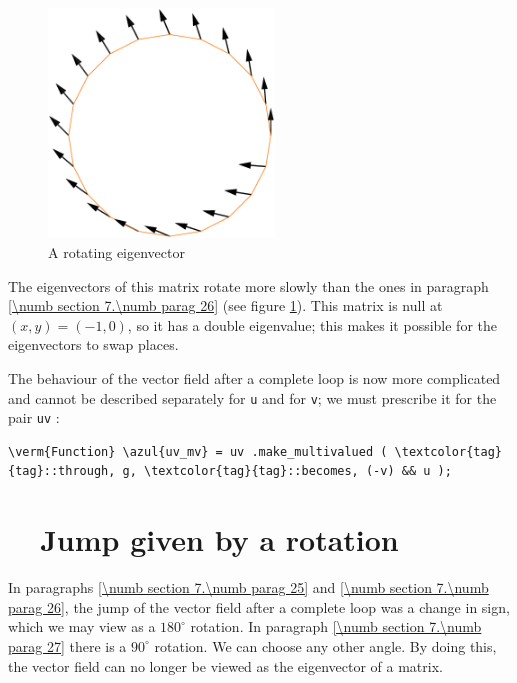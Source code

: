 \begin{figure}[ht] \centering
  \includegraphics[width=60mm]{circle-conca-swap.eps}
  \caption{A rotating eigenvector}
  \label{\numb section 7.\numb fig 23}
\end{figure}

The eigenvectors of this matrix rotate more slowly than the ones in paragraph
\ref{\numb section 7.\numb parag 26} (see figure \ref{\numb section 7.\numb fig 23}).
This matrix is null at $ (x,y) = (-1,0) $, so it has a double eigenvalue;
this makes it possible for the eigenvectors to swap places.

The behaviour of the vector field after a complete loop is now more complicated and cannot
be described separately for {\small\tt u} and for {\small\tt v}; we must prescribe it
for the pair {\small\tt uv} :

\begin{Verbatim}[commandchars=\\\{\},formatcom=\small\tt,frame=single,
   label=parag-\ref{\numb section 7.\numb parag 27}.cpp,rulecolor=\color{moldura},
   baselinestretch=0.94,framesep=2mm                                              ]
   \verm{Function} \azul{uv_mv} = uv .make_multivalued ( \textcolor{tag}{tag}::through, g, \textcolor{tag}{tag}::becomes, (-v) && u );
\end{Verbatim}


\section{~~Jump given by a rotation}  \label{\numb section 7.\numb parag 28}

In paragraphs \ref{\numb section 7.\numb parag 25} and \ref{\numb section 7.\numb parag 26},
the jump of the vector field after a complete loop was a change in sign,
which we may view as a $ 180^\circ $ rotation.
In paragraph \ref{\numb section 7.\numb parag 27} there is a $ 90^\circ $ rotation.
We can choose any other angle.
By doing this, the vector field can no longer be viewed as the eigenvector of a matrix.

